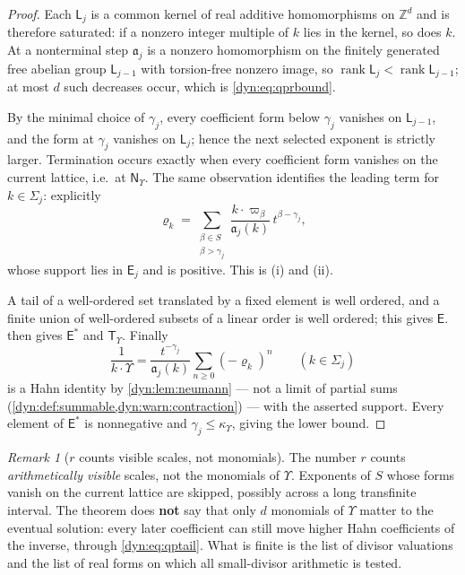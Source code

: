 \documentclass[11pt,letterpaper]{article}
\theoremstyle{definition}
\theoremstyle{remark}
\newtheorem{remark}[remark]{Remark}
\newcommand{\Z}{\mathbb Z}
\newcommand{\Tups}{\mathsf T_{\Upsilon}}
\newcommand{\qlat}{\mathsf N_{\Upsilon}}
\newcommand{\kups}{\kappa_{\Upsilon}}
\newcommand{\fla}{\mathfrak a}
\newcommand{\rank}{\operatorname{rank}}
\numberwithin{equation}{section}
\begin{document}
\begin{proof}
Each $\mathsf L_j$ is a common kernel of real additive homomorphisms on
$\Z^{d}$ and is therefore saturated: if a nonzero integer multiple of $k$
lies in the kernel, so does $k$. At a nonterminal step $\fla_j$ is a
nonzero homomorphism on the finitely generated free abelian group
$\mathsf L_{j-1}$ with torsion-free nonzero image, so $\rank\mathsf L_j<\rank
\mathsf L_{j-1}$; at most $d$ such decreases occur, which is
\eqref{dyn:eq:qprbound}.

By the minimal choice of $\gamma_j$, every coefficient form below
$\gamma_j$ vanishes on $\mathsf L_{j-1}$, and the form at $\gamma_j$
vanishes on $\mathsf L_j$; hence the next selected exponent is strictly
larger. Termination occurs exactly when every coefficient form vanishes on
the current lattice, i.e.\ at $\qlat$. The same observation identifies the
leading term for $k\in\Sigma_j$: explicitly
\begin{equation}\label{dyn:eq:qptail}
 \varrho_k=\sum_{\substack{\beta\in S\\ \beta>\gamma_j}}
 \frac{k\cdot\varpi_\beta}{\fla_j(k)}\,t^{\beta-\gamma_j},
\end{equation}
whose support lies in $\mathsf E_j$ and is positive. This is (i) and (ii).

A tail of a well-ordered set translated by a fixed element is well ordered,
and a finite union of well-ordered subsets of a linear order is well
ordered; this gives $\mathsf E$.  then gives
$\mathsf E^{*}$ and $\Tups$. Finally
\begin{equation}\label{dyn:eq:qpreciprocal}
 \frac1{k\cdot\Upsilon}
 =\frac{t^{-\gamma_j}}{\fla_j(k)}\sum_{n\ge0}(-\varrho_k)^{n}
 \qquad(k\in\Sigma_j)
\end{equation}
is a Hahn identity by \cref{dyn:lem:neumann} --- not a limit of partial
sums (\cref{dyn:def:summable,dyn:warn:contraction}) --- with the asserted
support. Every element of $\mathsf E^{*}$ is nonnegative and
$\gamma_j\le\kups$, giving the lower bound.
\end{proof}

\begin{remark}[$r$ counts visible scales, not monomials]
\label{dyn:rem:qpvisible}
The number $r$ counts \emph{arithmetically visible} scales, not the
monomials of $\Upsilon$. Exponents of $S$ whose forms vanish on the current
lattice are skipped, possibly across a long transfinite interval. The
theorem does \textbf{not} say that only $d$ monomials of $\Upsilon$ matter
to the eventual solution: every later coefficient can still move higher
Hahn coefficients of the inverse, through \eqref{dyn:eq:qptail}. What is
finite is the list of divisor valuations and the list of real forms on
which all small-divisor arithmetic is tested.
\end{remark}
\end{document}
